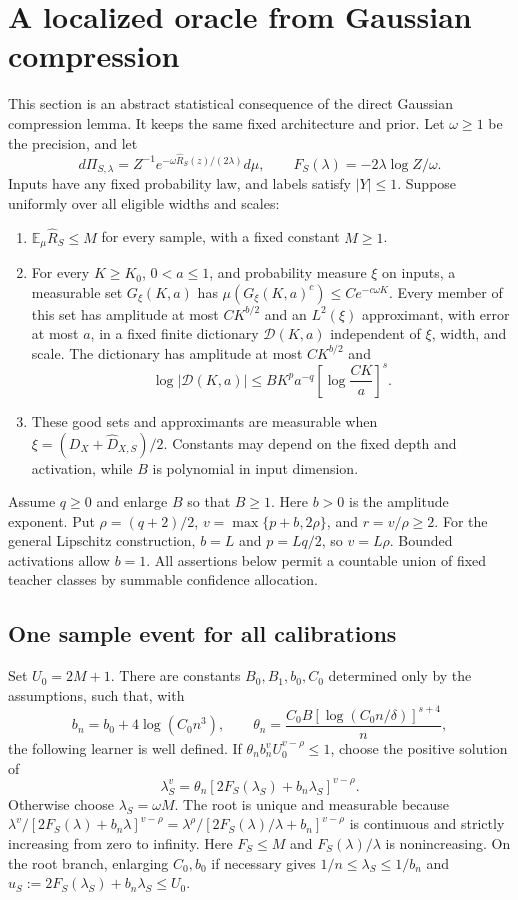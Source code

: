 \section{A localized oracle from Gaussian compression}
\label{sec:localized-direct-oracle}
This section is an abstract statistical consequence of the direct Gaussian
compression lemma. It keeps the same fixed architecture and prior.
Let $\omega\ge1$ be the precision, and let
\[
 d\Pi_{S,\lambda}=Z^{-1}e^{-\omega\widehat R_S(z)/(2\lambda)}d\mu,
 \qquad F_S(\lambda)=-2\lambda\log Z/\omega.
\]
Inputs have any fixed probability law, and labels satisfy $|Y|\le1$.
Suppose uniformly over all eligible widths and scales:
\begin{enumerate}
\item $\mathbb E_\mu\widehat R_S\le M$ for every sample, with a fixed
constant $M\ge1$.
\item For every $K\ge K_0$, $0<a\le1$, and probability measure $\xi$
on inputs, a measurable set $G_\xi(K,a)$ has
$\mu(G_\xi(K,a)^c)\le C e^{-c\omega K}$. Every member of this set has
amplitude at most $C K^{b/2}$ and an $L^2(\xi)$ approximant, with error
at most $a$, in a fixed finite dictionary $\mathcal D(K,a)$ independent
of $\xi$, width, and scale. The dictionary has amplitude at most
$C K^{b/2}$ and
\[
 \log|\mathcal D(K,a)|\le B K^p a^{-q}
       \left[\log\frac{C K}{a}\right]^s.
\]
\item These good sets and approximants are measurable when
$\xi=(D_X+\widehat D_{X,S})/2$. Constants may depend on the fixed depth
and activation, while $B$ is polynomial in input dimension.
\end{enumerate}
Assume $q\ge0$ and enlarge $B$ so that $B\ge1$.
Here $b>0$ is the amplitude exponent. Put $\rho=(q+2)/2$,
$v=\max\{p+b,2\rho\}$, and $r=v/\rho\ge2$.
For the general Lipschitz construction, $b=L$ and $p=Lq/2$, so
$v=L\rho$. Bounded activations allow $b=1$.
All assertions below permit a countable union of fixed teacher classes
by summable confidence allocation.

\subsection{One sample event for all calibrations}
Set $U_0=2M+1$. There are constants $B_0,B_1,b_0,C_0$ determined only
by the assumptions, such that, with
\[
 b_n=b_0+4\log(C_0 n^3),\qquad
 \theta_n=\frac{C_0 B[\log(C_0 n/\delta)]^{s+4}}{n},
\]
the following learner is well defined. If
$\theta_n b_n^v U_0^{v-\rho}\le1$, choose the positive solution of
\begin{equation}
 \lambda_S^v=\theta_n[2F_S(\lambda_S)+b_n\lambda_S]^{v-\rho}.
 \label{eq:localized-evidence-root}
\end{equation}
Otherwise choose $\lambda_S=\omega M$.
The root is unique and measurable because
$\lambda^v/[2F_S(\lambda)+b_n\lambda]^{v-\rho}
=\lambda^\rho/[2F_S(\lambda)/\lambda+b_n]^{v-\rho}$
is continuous and strictly increasing from zero to infinity.
Here $F_S\le M$ and $F_S(\lambda)/\lambda$ is nonincreasing.
On the root branch, enlarging $C_0,b_0$ if necessary gives
$1/n\le\lambda_S\le1/b_n$ and
$u_S:=2F_S(\lambda_S)+b_n\lambda_S\le U_0$.

